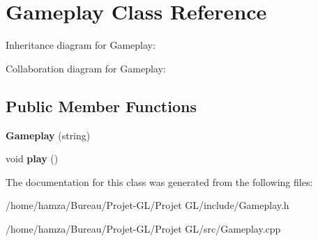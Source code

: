 \section{Gameplay Class Reference}
\label{class_gameplay}


Inheritance diagram for Gameplay\+:


Collaboration diagram for Gameplay\+:
\subsection*{Public Member Functions}
\begin{DoxyCompactItemize}
\item 
{\bfseries Gameplay} (string)\label{class_gameplay_af2912ef6ac2a135e1265996641bbe360}

\item 
void {\bfseries play} ()\label{class_gameplay_a39b2a4fe07eaacb9085dcfb9b93291a9}

\end{DoxyCompactItemize}


The documentation for this class was generated from the following files\+:\begin{DoxyCompactItemize}
\item 
/home/hamza/\+Bureau/\+Projet-\/\+G\+L/\+Projet G\+L/include/Gameplay.\+h\item 
/home/hamza/\+Bureau/\+Projet-\/\+G\+L/\+Projet G\+L/src/Gameplay.\+cpp\end{DoxyCompactItemize}
